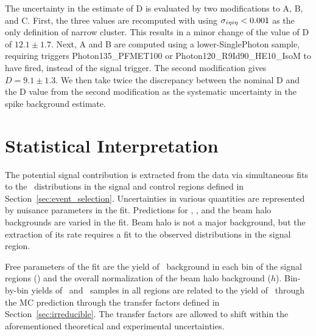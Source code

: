 The uncertainty in the estimate of D is evaluated by two modifications to A, B, and C.
First, the three values are recomputed with using $\sigma_{i\eta i\eta} < 0.001$ as the only definition of narrow cluster. 
This results in a minor change of the value of D of $12.1 \pm 1.7$. Next, A and B are computed using a lower-\pt SinglePhoton sample, requiring triggers Photon135\_PFMET100 or Photon120\_R9Id90\_HE10\_IsoM to have fired, instead of the signal trigger. 
The second modification gives $D=9.1 \pm 1.3$. 
We then take twice the discrepancy between the nominal D and the D value from the second modification as the systematic uncertainty in the spike background estimate.

\section{Statistical Interpretation}
\label{sec:interpretation}

The potential signal contribution is extracted from the data via simultaneous fits to the
\ETg\ distributions in the signal and control regions defined in Section~\ref{sec:event_selection}. 
Uncertainties in various quantities are represented by nuisance parameters in the fit. 
Predictions for \zinvg, \wlng, and the beam halo backgrounds are varied in the fit. 
Beam halo is not a major background, but the extraction of its rate requires a fit to the observed distributions in the signal region.

Free parameters of the fit are the yield of \zinvg\ background in each bin of the signal regions (\NZg[i]) and the overall normalization of the beam halo background ($h$). 
Bin-by-bin yields of \wlng\ and \zllg\ samples in all regions are related to the yield of \zinvg\ through the MC prediction through the transfer factors defined in Section~\ref{sec:irreducible}. 
The transfer factors are allowed to shift within the aforementioned theoretical and experimental uncertainties.

